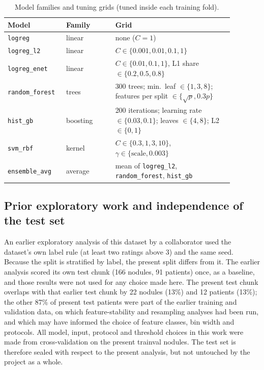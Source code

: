 \documentclass[journal]{IEEEtran}
\newcommand{\code}[1]{\texttt{#1}}
\begin{document}
\begin{table}[!t]
\caption{Model families and tuning grids (tuned inside each training fold).}
\label{tab:grids}
\centering\small
\begin{tabular}{p{0.20\linewidth}p{0.20\linewidth}p{0.48\linewidth}}
\toprule
Model & Family & Grid\\
\midrule
\code{logreg}        & linear & none ($C=1$)\\
\code{logreg\_l2}    & linear & $C\in\{0.001,0.01,0.1,1\}$\\
\code{logreg\_enet}  & linear~\cite{zou2005elasticnet} & $C\in\{0.01,0.1,1\}$, L1 share $\in\{0.2,0.5,0.8\}$\\
\code{random\_forest}& trees~\cite{breiman2001rf} & 300 trees; min.\ leaf $\in\{1,3,8\}$; features per split $\in\{\sqrt{p},0.3p\}$\\
\code{hist\_gb}      & boosting~\cite{friedman2001gbm} & 200 iterations; learning rate $\in\{0.03,0.1\}$; leaves $\in\{4,8\}$; L2 $\in\{0,1\}$\\
\code{svm\_rbf}      & kernel & $C\in\{0.3,1,3,10\}$, $\gamma\in\{\text{scale},0.003\}$\\
\code{ensemble\_avg} & average & mean of \code{logreg\_l2}, \code{random\_forest}, \code{hist\_gb}\\
\bottomrule
\end{tabular}
\end{table}

\subsection{Prior exploratory work and independence of the test set}
\label{sec:disclosure}
An earlier exploratory analysis of this dataset by a collaborator used the dataset's own label rule (at least two
ratings above 3) and the same seed. Because the split is stratified by label, the present split differs from it. The earlier
analysis scored its own test chunk (166 nodules, 91 patients) once, as a baseline, and those results were not used for any
choice made here. The present test chunk overlaps with that earlier test chunk by 22 nodules (13\%) and 12 patients (13\%);
the other 87\% of present test patients were part of the earlier training and validation data, on which feature-stability
and resampling analyses had been run, and which may have informed the choice of feature classes, bin width and protocols.
All model, input, protocol and threshold choices in this work were made from cross-validation on the present trainval
nodules. The test set is therefore sealed with respect to the present analysis, but not untouched by the project as a whole.
\end{document}

